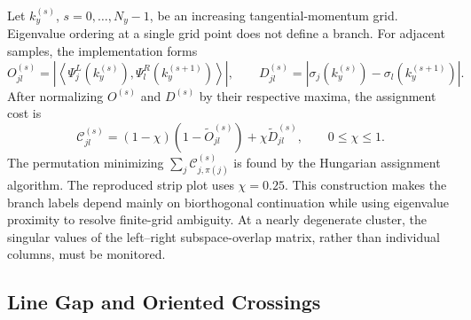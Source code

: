 \documentclass[11pt]{article}
\numberwithin{equation}{section}
\begin{document}
Let $k_y^{(s)}$, $s=0,\ldots,N_y-1$, be an increasing tangential-momentum
grid.  Eigenvalue ordering at a single grid point does not define a branch.
For adjacent samples, the implementation forms
\begin{equation}
  O_{jl}^{(s)}=
  \left|\left\langle
  \Psi_j^L(k_y^{(s)}),\Psi_l^R(k_y^{(s+1)})
  \right\rangle\right|,
  \qquad
  D_{jl}^{(s)}=
  \left|\sigma_j(k_y^{(s)})-\sigma_l(k_y^{(s+1)})\right|.
  \label{eq:branch_overlap_distance}
\end{equation}
After normalizing $O^{(s)}$ and $D^{(s)}$ by their respective maxima, the
assignment cost is
\begin{equation}
  \mathcal C_{jl}^{(s)}=
  (1-\chi)(1-\widetilde O_{jl}^{(s)})
  +\chi\widetilde D_{jl}^{(s)},
  \qquad 0\leq\chi\leq1.
  \label{eq:branch_assignment_cost}
\end{equation}
The permutation minimizing $\sum_j\mathcal C_{j,\pi(j)}^{(s)}$ is found by
the Hungarian assignment algorithm.  The reproduced strip plot uses
$\chi=0.25$.  This construction makes the branch labels depend mainly on
biorthogonal continuation while using eigenvalue proximity to resolve
finite-grid ambiguity.  At a nearly degenerate cluster, the singular
values of the left--right subspace-overlap matrix, rather than individual
columns, must be monitored.

\subsection{Line Gap and Oriented Crossings}
\end{document}
